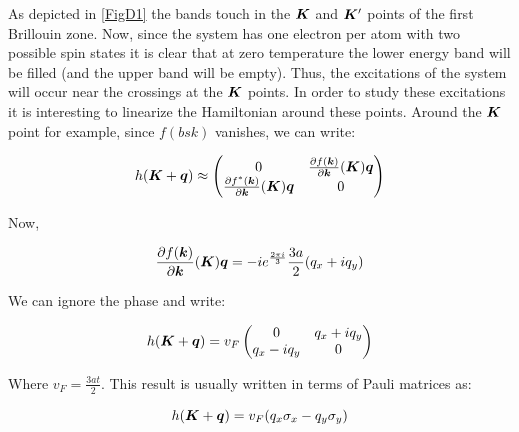 As depicted in \ref{FigD1} the bands touch in the $\boldsymbol{K}$ and $\boldsymbol{K}'$ points of the first Brillouin zone. Now, since the system has one electron per atom with two possible spin states it is clear that at zero temperature the lower energy band will be filled (and the upper band will be empty). Thus, the excitations of the system will occur near the crossings at the $\boldsymbol{K}$ points. In order to study these excitations it is interesting to linearize the Hamiltonian around these points. Around the $\boldsymbol{K}$ point for example, since $f(bs{k})$ vanishes, we can write:

\begin{equation}
h(\boldsymbol{K}+\boldsymbol{q}) \approx \begin{pmatrix}
    0 & \frac{\partial f(\boldsymbol{k})}{\partial \boldsymbol{k}}(\boldsymbol{K})\boldsymbol{q} \\
    \frac{\partial f^*(\boldsymbol{k})}{\partial \boldsymbol{k}}(\boldsymbol{K})\boldsymbol{q} & 0
\end{pmatrix}
\end{equation}

Now, 

\begin{equation}
\frac{\partial f(\boldsymbol{k})}{\partial \boldsymbol{k}}(\boldsymbol{K})\boldsymbol{q} = -ie^{\frac{2\pi i}{3}} \frac{3a}{2}(q_x+iq_y)
\end{equation}

We can ignore the phase and write:

\begin{equation}
h(\boldsymbol{K}+\boldsymbol{q}) = v_F \begin{pmatrix}
    0 & q_x+iq_y \\
    q_x-iq_y & 0
\end{pmatrix}
\end{equation}

Where $v_F = \frac{3at}{2}$. This result is usually written in terms of Pauli matrices as:

\begin{equation}
h(\boldsymbol{K}+\boldsymbol{q}) = v_F(q_x\sigma_x-q_y\sigma_y)
\end{equation}
